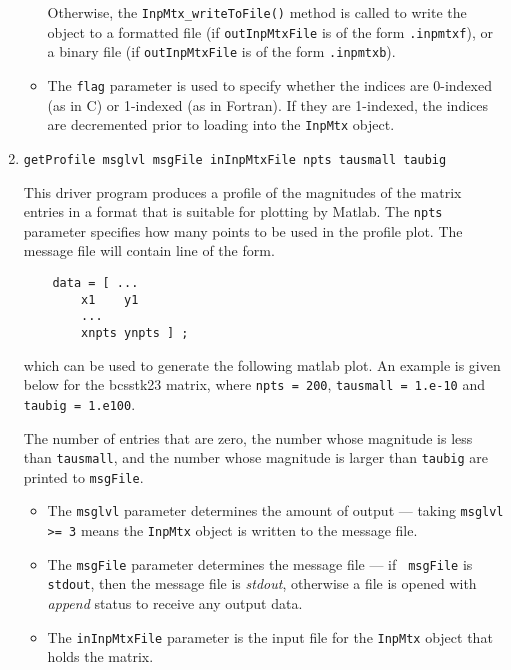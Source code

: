 \begin{enumerate}
\begin{itemize}
Otherwise, the {\tt InpMtx\_writeToFile()} method is called to write
the object to 
a formatted file (if {\tt outInpMtxFile} 
is of the form {\tt *.inpmtxf}), or
a binary file (if {\tt outInpMtxFile} is of the form {\tt *.inpmtxb}).
\item
The {\tt flag} parameter is used to specify whether the 
indices are 0-indexed (as in C) or 1-indexed (as in Fortran).
If they are 1-indexed, the indices are decremented
prior to loading into the {\tt InpMtx} object.
\end{itemize}
\item
\begin{verbatim}
getProfile msglvl msgFile inInpMtxFile npts tausmall taubig
\end{verbatim}
This driver program produces a profile of the magnitudes 
of the matrix entries in a format that is suitable for plotting
by Matlab.
The {\tt npts} parameter specifies how many points to be used
in the profile plot.
The message file will contain line of the form.
\begin{verbatim}
    data = [ ...
        x1    y1
        ...
        xnpts ynpts ] ;
\end{verbatim}
which can be used to generate the following matlab plot.
An example is given below for the {\sc bcsstk23} matrix, where
{\tt npts = 200}, {\tt tausmall = 1.e-10} and
{\tt taubig = 1.e100}.
\begin{center}
\end{center}
The number of entries that are zero,
the number whose magnitude is less than {\tt tausmall},
and the number whose magnitude is larger than {\tt taubig}
are printed to {\tt msgFile}.
\par
\begin{itemize}
\item
The {\tt msglvl} parameter determines the amount of output ---
taking {\tt msglvl >= 3} means the {\tt InpMtx} object is written
to the message file.
\item
The {\tt msgFile} parameter determines the message file --- if {\tt
msgFile} is {\tt stdout}, then the message file is {\it stdout},
otherwise a file is opened with {\it append} status to receive any
output data.
\item
The {\tt inInpMtxFile} parameter is the input file for 
the {\tt InpMtx} object that holds the matrix.

\end{itemize}
\end{enumerate}
